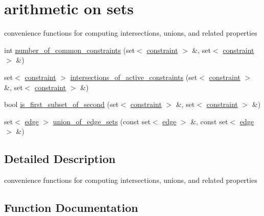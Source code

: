 \hypertarget{group___set_arithmetic}{}\section{arithmetic on sets}
\label{group___set_arithmetic}


convenience functions for computing intersections, unions, and related properties  


\begin{DoxyCompactItemize}
\item 
int \hyperlink{group___set_arithmetic_ga277915858d16f125ab4fc01ed84e6989}{number\+\_\+of\+\_\+common\+\_\+constraints} (set$<$ \hyperlink{classconstraint}{constraint} $>$ \&, set$<$ \hyperlink{classconstraint}{constraint} $>$ \&)
\item 
set$<$ \hyperlink{classconstraint}{constraint} $>$ \hyperlink{group___set_arithmetic_gaf7e728b1750953e1f5331dbc21f3c02d}{intersections\+\_\+of\+\_\+active\+\_\+constraints} (set$<$ \hyperlink{classconstraint}{constraint} $>$ \&, set$<$ \hyperlink{classconstraint}{constraint} $>$ \&)
\item 
bool \hyperlink{group___set_arithmetic_ga429f8cae774d16957f029449f120d895}{is\+\_\+first\+\_\+subset\+\_\+of\+\_\+second} (set$<$ \hyperlink{classconstraint}{constraint} $>$ \&, set$<$ \hyperlink{classconstraint}{constraint} $>$ \&)
\item 
set$<$ \hyperlink{classedge}{edge} $>$ \hyperlink{group___set_arithmetic_ga2b6dbec1643b53f8e613b0a3de07f3ce}{union\+\_\+of\+\_\+edge\+\_\+sets} (const set$<$ \hyperlink{classedge}{edge} $>$ \&, const set$<$ \hyperlink{classedge}{edge} $>$ \&)
\end{DoxyCompactItemize}


\subsection{Detailed Description}
convenience functions for computing intersections, unions, and related properties 



\subsection{Function Documentation}
\hypertarget{group___set_arithmetic_gaf7e728b1750953e1f5331dbc21f3c02d}{}
